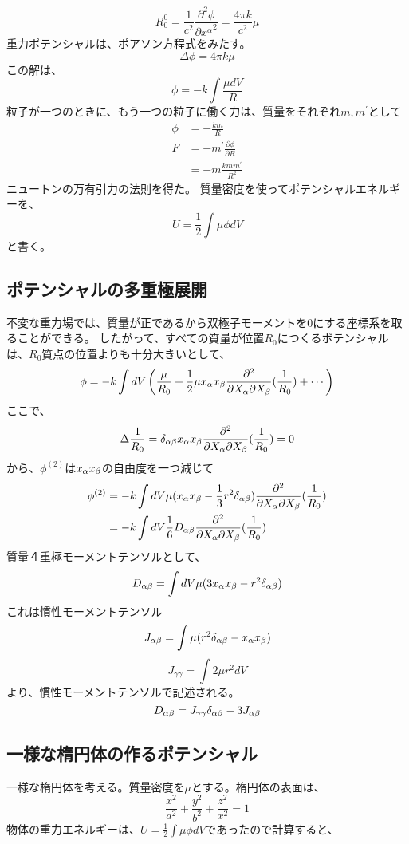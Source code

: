\documentclass{jsarticle}
\newcommand{\pder}[2][]{\frac{\partial#1}{\partial#2}}
\newcommand{\ppder}[2][]{\frac{\partial^2#1}{{\partial#2}^2}}
\newcommand{\pikder}[3][]{\frac{\partial^2#1}{{\partial#2 \partial#3}}}
\newcommand{\half}{\frac{1}{2}}
\newcommand{\ddfrac}[2]{\frac{{#1}^2}{{#2}^2}}
\newcommand{\beq}{\begin{equation}}
\newcommand{\eeq}{\end{equation}}
\begin{document}
\beq
R^0_0 = \frac{1}{c^2} \ppder[\phi]{{x^\alpha}} = \frac{4\pi k}{c^2} \mu
\eeq
重力ポテンシャルは、ポアソン方程式をみたす。
\beq
    \Delta  \phi = 4 \pi k \mu
\eeq
この解は、
\beq
    \phi = -k \int \frac{\mu dV}{R}
\eeq
粒子が一つのときに、もう一つの粒子に働く力は、質量をそれぞれ$m,m^\prime$として
\begin{align}
    \phi &= - \frac{km}{R}\\
    F &= - m^\prime \pder[\phi]{R}\\
      &= -m \frac{kmm^\prime}{R^2}
\end{align}
ニュートンの万有引力の法則を得た。
質量密度を使ってポテンシャルエネルギーを、
\beq
U = \half \int \mu \phi dV
\eeq
と書く。
\subsection{ポテンシャルの多重極展開}
不変な重力場では、質量が正であるから双極子モーメントを$0$にする座標系を取ることができる。
したがって、すべての質量が位置$R_0$につくるポテンシャルは、$R_0$質点の位置よりも十分大きいとして、
\beq
\phi = -k \int dV \left(\frac{\mu}{R_0} + \half \mu x_\al x_\be \pikder[]{X_\al}{X_\be}(\frac{1}{R_0}) + \cdots \right)
\eeq
ここで、
\beq
    \Delta \frac{1}{R_0} = \delta_{\al \be} x_\al x_\be \pikder[]{X_\al}{X_\be}(\frac{1}{R_0}) = 0
\eeq
から、$\phi^{(2)}$は$x_\alpha x_\beta$の自由度を一つ減じて
\begin{align}
    \phi^{(2)} &= -k \int dV \mu (x_\al x_\be - \frac{1}{3}r^2 \delta_{\al \be})\pikder[]{X_\al}{X_\be}(\frac{1}{R_0})\\
               &= -k \int dV \frac{1}{6} D_{\al \be} \pikder[]{X_\al}{X_\be}(\frac{1}{R_0})
\end{align}
質量４重極モーメントテンソルとして、
\beq
D_{\al \be} = \int dV \mu(3x_\al x_\be - r^2 \delta_{\al \be})
\eeq
これは慣性モーメントテンソル
\beq
    J_{\al \be} = \int \mu (r^2 \delta_{\al \be} - x_\al x_\be)
\eeq
\beq
J_{\gamma \gamma} = \int 2 \mu r^2 dV 
\eeq
より、慣性モーメントテンソルで記述される。
\beq
D_{\al \be} = J_{\gamma \gamma}\delta_{\al \be} - 3 J_{\al \be}
\eeq
\subsection{一様な楕円体の作るポテンシャル}
一様な楕円体を考える。質量密度を$\mu$とする。楕円体の表面は、
\beq
\ddfrac{x}{a} + \ddfrac{y}{b} + \ddfrac{z}{x} = 1
\eeq
物体の重力エネルギーは、$U = \half \int \mu \phi dV$であったので計算すると、
\end{document}
